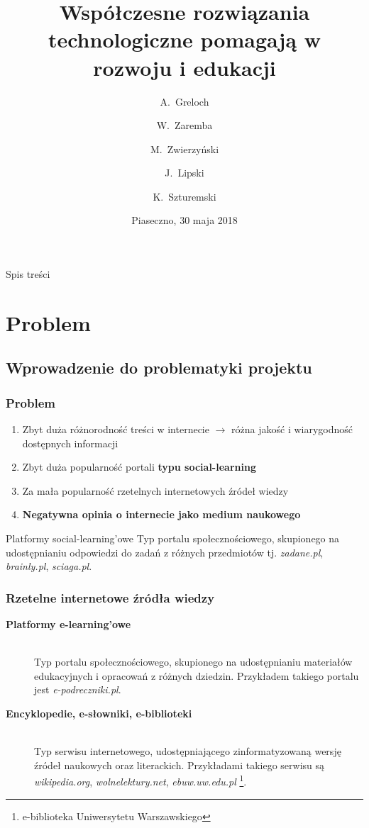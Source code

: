 \documentclass[10pt]{beamer}
\title[]
{
  Współczesne rozwiązania technologiczne pomagają w rozwoju i edukacji
}
\author[A.~Greloch \and W.~Zaremba \and M.~Zwierzyński \and J.~Lipski \and K.~Szturemski]
{
  A.~Greloch \and W.~Zaremba \and M.~Zwierzyński \and J.~Lipski \and K.~Szturemski
}
\institute[G1PIA]
{
  Klasa 3j\\
  Gimnazjum nr. 1 im. Powstańców Warszawy w Piasecznie
}
\date
{
  Piaseczno, 30 maja 2018
}
\begin{document}
\frame{\titlepage}

\begin{frame}{Spis treści}
\tableofcontents
\end{frame}

\section{Problem}
\subsection{Wprowadzenie do problematyki projektu}

\begin{frame}
  \frametitle{Problem}
  \begin{enumerate}
    \item Zbyt duża różnorodność treści w internecie $\rightarrow$ różna jakość i wiarygodność dostępnych informacji
    \item Zbyt duża popularność portali \textbf{typu social-learning}
    \item Za mała popularność rzetelnych internetowych źródeł wiedzy
    \item \textbf{Negatywna opinia o internecie jako medium naukowego}
  \end{enumerate}
  \begin{block}{Platformy social-learning'owe}
    Typ portalu społecznościowego, skupionego na udostępnianiu odpowiedzi do zadań z różnych przedmiotów tj. \emph{zadane.pl}, \emph{brainly.pl}, \emph{sciaga.pl}.
  \end{block}
\end{frame}

\begin{frame}
  \frametitle{Rzetelne internetowe źródła wiedzy}
  \small

  \begin{description}
    \item [\textbf{Platformy e-learning'owe}]\hfill\\ Typ portalu społecznościowego, skupionego na udostępnianiu materiałów edukacyjnych i opracowań z różnych dziedzin. Przykładem takiego portalu jest \emph{e-podreczniki.pl}.
    \item [\textbf{Encyklopedie, e-słowniki, e-biblioteki}]\hfill\\ Typ serwisu internetowego, udostępniającego zinformatyzowaną wersję źródeł naukowych oraz literackich. Przykładami takiego serwisu są \emph{wikipedia.org}, \emph{wolnelektury.net}, \emph{ebuw.uw.edu.pl} \footnote[frame]{e-biblioteka Uniwersytetu Warszawskiego}.
  \end{description}

\end{frame}
\end{document}
